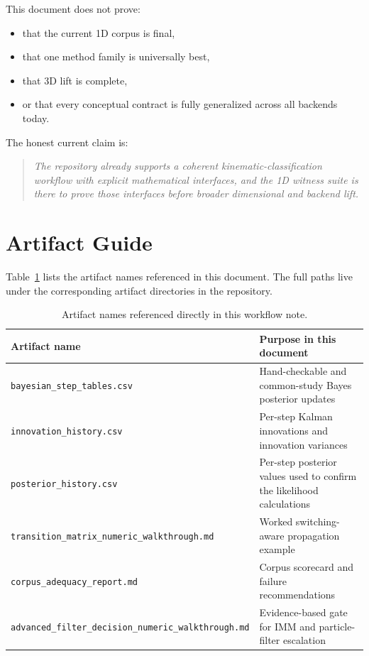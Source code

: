 \documentclass[11pt]{article}
\begin{document}
This document does not prove:
\begin{itemize}[leftmargin=1.5em]
  \item that the current 1D corpus is final,
  \item that one method family is universally best,
  \item that 3D lift is complete,
  \item or that every conceptual contract is fully generalized across all backends today.
\end{itemize}

The honest current claim is:
\begin{quote}
\textit{The repository already supports a coherent kinematic-classification workflow with explicit mathematical interfaces, and the 1D witness suite is there to prove those interfaces before broader dimensional and backend lift.}
\end{quote}

\section{Artifact Guide}
Table~\ref{tab:artifact_guide} lists the artifact names referenced in this document. The full paths live under the corresponding artifact directories in the repository.

\small
\begin{table}[htbp]
\centering
\caption{Artifact names referenced directly in this workflow note.}
\label{tab:artifact_guide}
\begin{tabularx}{\textwidth}{@{}lX@{}}
\toprule
Artifact name & Purpose in this document \\
\midrule
\texttt{bayesian\_step\_tables.csv} & Hand-checkable and common-study Bayes posterior updates \\
\texttt{innovation\_history.csv} & Per-step Kalman innovations and innovation variances \\
\texttt{posterior\_history.csv} & Per-step posterior values used to confirm the likelihood calculations \\
\texttt{transition\_matrix\_numeric\_walkthrough.md} & Worked switching-aware propagation example \\
\texttt{corpus\_adequacy\_report.md} & Corpus scorecard and failure recommendations \\
\texttt{advanced\_filter\_decision\_numeric\_walkthrough.md} & Evidence-based gate for IMM and particle-filter escalation \\
\bottomrule
\end{tabularx}
\end{table}
\normalsize
\end{document}
